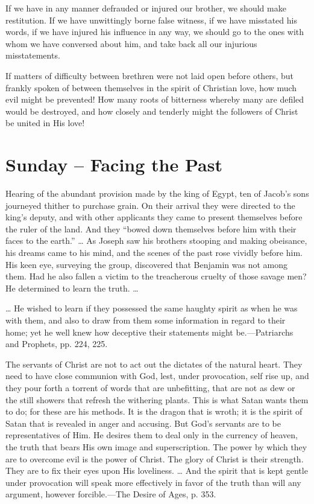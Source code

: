\documentclass[a4paper, 10pt, twoside, headings=small]{scrartcl}
\begin{document}
\begin{multicols}{2}
If we have in any manner defrauded or injured our brother, we should make restitution. If we have unwittingly borne false witness, if we have misstated his words, if we have injured his influence in any way, we should go to the ones with whom we have conversed about him, and take back all our injurious misstatements.

If matters of difficulty between brethren were not laid open before others, but frankly spoken of between themselves in the spirit of Christian love, how much evil might be prevented! How many roots of bitterness whereby many are defiled would be destroyed, and how closely and tenderly might the followers of Christ be united in His love!

\section*{Sunday – Facing the Past}

Hearing of the abundant provision made by the king of Egypt, ten of Jacob’s sons journeyed thither to purchase grain. On their arrival they were directed to the king’s deputy, and with other applicants they came to present themselves before the ruler of the land. And they “bowed down themselves before him with their faces to the earth.” … As Joseph saw his brothers stooping and making obeisance, his dreams came to his mind, and the scenes of the past rose vividly before him. His keen eye, surveying the group, discovered that Benjamin was not among them. Had he also fallen a victim to the treacherous cruelty of those savage men? He determined to learn the truth. …

… He wished to learn if they possessed the same haughty spirit as when he was with them, and also to draw from them some information in regard to their home; yet he well knew how deceptive their statements might be.—Patriarchs and Prophets, pp. 224, 225.

The servants of Christ are not to act out the dictates of the natural heart. They need to have close communion with God, lest, under provocation, self rise up, and they pour forth a torrent of words that are unbefitting, that are not as dew or the still showers that refresh the withering plants. This is what Satan wants them to do; for these are his methods. It is the dragon that is wroth; it is the spirit of Satan that is revealed in anger and accusing. But God’s servants are to be representatives of Him. He desires them to deal only in the currency of heaven, the truth that bears His own image and superscription. The power by which they are to overcome evil is the power of Christ. The glory of Christ is their strength. They are to fix their eyes upon His loveliness. … And the spirit that is kept gentle under provocation will speak more effectively in favor of the truth than will any argument, however forcible.—The Desire of Ages, p. 353.


\end{multicols}
\end{document}
